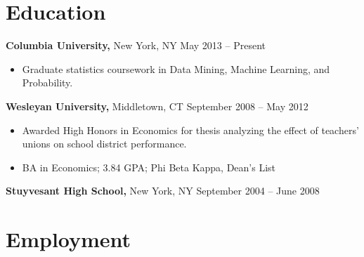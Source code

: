 \documentclass{res}
\begin{document}
 
\setlength{\parskip}{5.2pt}
\renewcommand{\labelitemi}{\scriptsize$\bullet$} 

\address{}
\address{\href{http://maxlivingston.org}{maxlivingston.org} | \href{http://github.com/maxliving}{github.com/maxliving}}

\begin{resume} 


\section{Education} 
  {\bf Columbia University,} New York, NY \hfill May 2013 -- Present
  \begin{itemize} \itemsep -2pt
  \item Graduate statistics coursework in Data Mining, Machine Learning, and Probability.
  \end{itemize}
  {\bf Wesleyan University,} Middletown, CT \hfill September 2008 -- May 2012
  \begin{itemize} \itemsep -2pt
  \item Awarded High Honors in Economics for thesis analyzing the effect of teachers' unions on school district performance.
  \item BA in Economics; 3.84 GPA; Phi Beta Kappa, Dean's List
  \end{itemize}

  {\bf Stuyvesant High School,} New York, NY \hfill September 2004 -- June 2008
  

  \section{Employment}


\end{resume}
\end{document}
